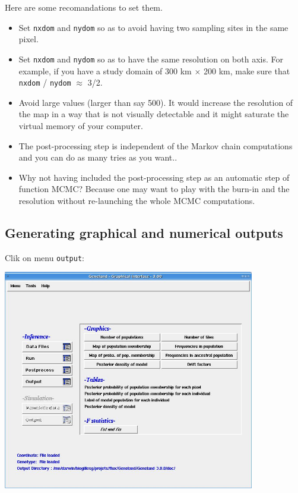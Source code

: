 \documentclass[a4paper,10pt]{article}
\begin{document}
Here are some recomandations to set them.
\begin{itemize}
\item Set \texttt{nxdom} and \texttt{nydom} so as to avoid having two sampling sites in the same pixel.
\item Set \texttt{nxdom} and \texttt{nydom} so as to have the same resolution on both axis. For example, if you have 
a study domain of 300 km $\times$ 200 km, make sure that \texttt{nxdom} / \texttt{nydom} $\approx$ 3/2.
\item Avoid large values (larger than say 500). It would increase the resolution of the map in a way that is not visually detectable and it might saturate the virtual memory of your computer. 
\item The post-processing step is independent of the Markov chain computations and you can do as many tries as you want.. 
\item Why not having included the post-processing step as an automatic step of function MCMC? 
Because one may want to play with the burn-in and the resolution without re-launching the whole MCMC computations.
\end{itemize}


 
\clearpage
\subsection{Generating graphical and numerical outputs}

Clik on menu \texttt{output}:\\



\centerline{\includegraphics[width=11cm]{./fig/output.jpg}}
\end{document}
